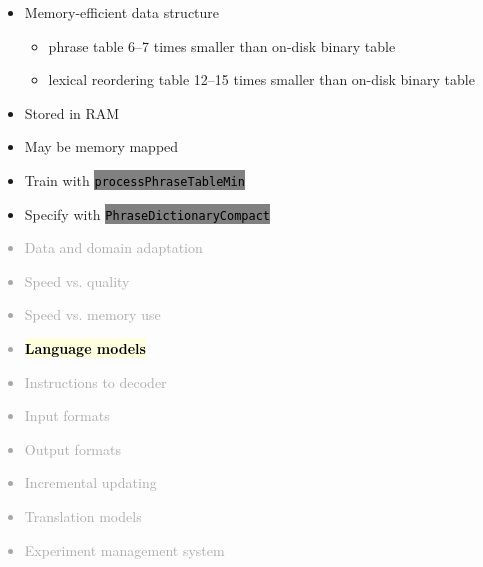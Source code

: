 \documentclass[landscape]{uedslides2C}
\newcommand{\currenttopic}[1]{\colorbox{lightyellow}{\textcolor{black}{\bf #1}}}
\newcommand{\littlecode}[1]{\colorbox{gray}{\textcolor{black}{\small \tt #1}}}
\begin{document}

\begin{itemize}
\item Memory-efficient data structure
\begin{itemize}
\item phrase table 6--7 times smaller than on-disk binary table
\item lexical reordering table 12--15 times smaller than on-disk binary table
\end{itemize}
\item Stored in RAM
\item May be memory mapped
\item Train with \littlecode{processPhraseTableMin}
\item Specify with \littlecode{PhraseDictionaryCompact}
\end{itemize}


\vspace{-5mm}
\textcolor{darkgrey}{
\begin{itemize} \itemsep -1mm
\item Data and domain adaptation
\item Speed vs. quality
\item Speed vs. memory use
\item \currenttopic{Language models}
\item Instructions to decoder
\item Input formats
\item Output formats
\item Incremental updating
\item Translation models
\item Experiment management system
\end{itemize}
}

\end{document}
